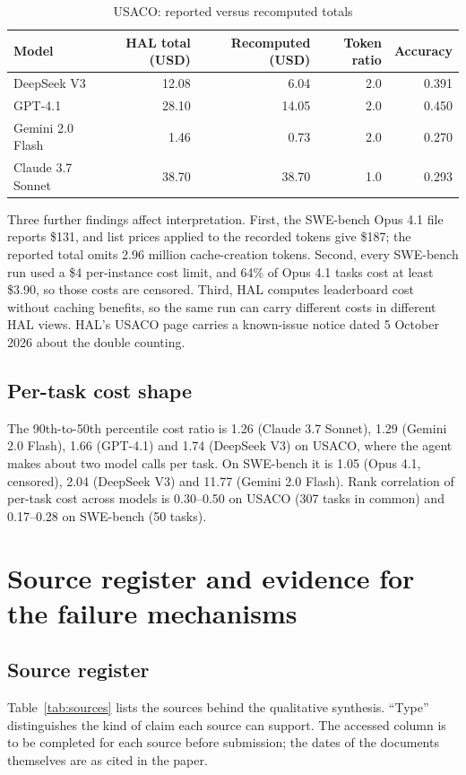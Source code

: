 \documentclass[10pt]{article}
\begin{document}
\begin{table}[h]
\caption{USACO: reported versus recomputed totals}\label{tab:val}
\centering\small
\begin{tabular}{lrrrr}
\toprule
Model & HAL total (USD) & Recomputed (USD) & Token ratio & Accuracy \\
\midrule
DeepSeek V3 & 12.08 & 6.04 & 2.0 & 0.391 \\
GPT-4.1 & 28.10 & 14.05 & 2.0 & 0.450 \\
Gemini 2.0 Flash & 1.46 & 0.73 & 2.0 & 0.270 \\
Claude 3.7 Sonnet & 38.70 & 38.70 & 1.0 & 0.293 \\
\bottomrule
\end{tabular}
\end{table}

Three further findings affect interpretation. First, the SWE-bench Opus 4.1 file reports \$131, and list prices applied to the recorded tokens give \$187; the reported total omits 2.96 million cache-creation tokens. Second, every SWE-bench run used a \$4 per-instance cost limit, and 64\% of Opus 4.1 tasks cost at least \$3.90, so those costs are censored. Third, HAL computes leaderboard cost without caching benefits, so the same run can carry different costs in different HAL views. HAL's USACO page carries a known-issue notice dated 5 October 2026 about the double counting.

\subsection{Per-task cost shape}
The 90th-to-50th percentile cost ratio is 1.26 (Claude 3.7 Sonnet), 1.29 (Gemini 2.0 Flash), 1.66 (GPT-4.1) and 1.74 (DeepSeek V3) on USACO, where the agent makes about two model calls per task. On SWE-bench it is 1.05 (Opus 4.1, censored), 2.04 (DeepSeek V3) and 11.77 (Gemini 2.0 Flash). Rank correlation of per-task cost across models is 0.30--0.50 on USACO (307 tasks in common) and 0.17--0.28 on SWE-bench (50 tasks).

\section{Source register and evidence for the failure mechanisms}
\subsection{Source register}
Table~\ref{tab:sources} lists the sources behind the qualitative synthesis. ``Type'' distinguishes the kind of claim each source can support. The accessed column is to be completed for each source before submission; the dates of the documents themselves are as cited in the paper.
\end{document}
